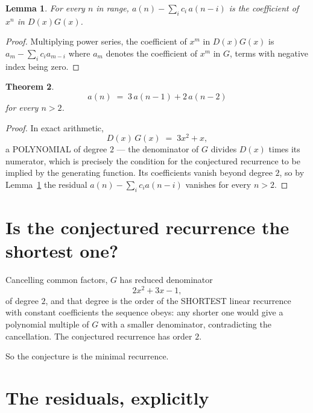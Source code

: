 \documentclass[11pt,a4paper]{article}
\theoremstyle{plain}
\newtheorem{theorem}{Theorem}
\newtheorem{lemma}[theorem]{Lemma}
\theoremstyle{definition}
\begin{document}
\begin{lemma}\label{lem:key}
For every $n$ in range, $a(n)-\sum_i c_i\,a(n-i)$ is the coefficient of $x^{n}$ in
$D(x)G(x)$.
\end{lemma}

\begin{proof}
Multiplying power series, the coefficient of $x^{m}$ in $D(x)G(x)$ is
$a_m-\sum_i c_i a_{m-i}$ where $a_m$ denotes the coefficient of $x^{m}$ in $G$, terms with
negative index being zero.
\end{proof}

\begin{theorem}
\[
a(n)\;=\;3\,a(n-1) + 2\,a(n-2)
\]
for every $n>2$.
\end{theorem}

\begin{proof}
In exact arithmetic,
\[
D(x)\,G(x)\;=\;3 x^{2} + x,
\]
a POLYNOMIAL of degree $2$ --- the denominator of $G$ divides $D(x)$ times its numerator,
which is precisely the condition for the conjectured recurrence to be implied by the
generating function. Its coefficients vanish beyond degree $2$, so by
Lemma~\ref{lem:key} the residual $a(n)-\sum_ic_ia(n-i)$ vanishes for every
$n>2$.
\end{proof}

\section{Is the conjectured recurrence the shortest one?}

Cancelling common factors, $G$ has reduced denominator
\[
2 x^{2} + 3 x - 1,
\]
of degree $2$, and that degree is the order of the SHORTEST linear recurrence with
constant coefficients the sequence obeys: any shorter one would give a polynomial multiple of
$G$ with a smaller denominator, contradicting the cancellation. The conjectured recurrence has
order $2$.

So the conjecture is the minimal recurrence.

\section{The residuals, explicitly}
\end{document}
